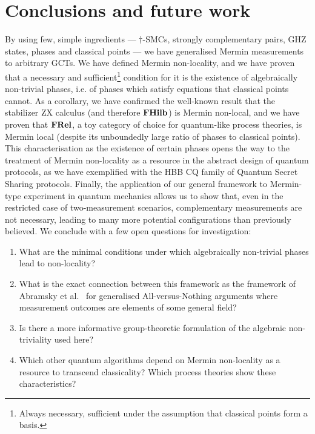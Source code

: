 
\section{Conclusions and future work}
        \label{section_conclusion}
        By using few, simple ingredients --- $\dagger$-SMCs, strongly complementary pairs, GHZ states, phases and classical points --- we have generalised Mermin measurements to arbitrary GCTs. 
        We have defined Mermin non-locality, and we have proven that a necessary and sufficient\footnote{Always necessary, sufficient under the assumption that classical points form a basis.} condition for it is the existence of algebraically non-trivial phases, i.e. of phases which satisfy equations that classical points cannot. 
        As a corollary, we have confirmed the well-known result that the stabilizer ZX calculus (and therefore $\mathbf{FHilb}$) is Mermin non-local, and we have proven that $\mathbf{FRel}$, a toy category of choice for quantum-like process theories, is Mermin local (despite its unboundedly large ratio of phases to classical points). 
        This characterisation as the existence of certain phases opens the way to the treatment of Mermin non-locality as a resource in the abstract design of quantum protocols, as we have exemplified with the HBB CQ family of Quantum Secret Sharing protocols. 
        Finally, the application of our general framework to Mermin-type experiment in quantum mechanics allows us to show that, even in the restricted case of two-measurement scenarios, complementary measurements are not necessary, leading to many more potential configurations than previously believed.
        We conclude with a few open questions for investigation:
        \begin{enumerate}
        \item What are the minimal conditions under which algebraically non-trivial phases lead to non-locality?
        \item What is the exact connection between this framework as the framework of Abramsky et al.~\cite{NLC-AvN} for generalised All-versus-Nothing arguments where measurement outcomes are elements of some general field?
        \item Is there a more informative group-theoretic formulation of the algebraic non-triviality used here?
        \item Which other quantum algorithms depend on Mermin non-locality as a resource to transcend classicality? Which process theories show these characteristics?
        \end{enumerate}

